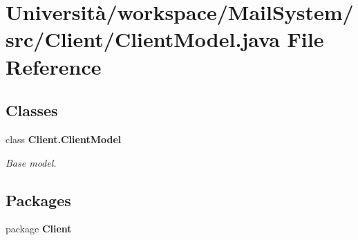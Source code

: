 \section{Università/workspace/\+Mail\+System/src/\+Client/\+Client\+Model.java File Reference}
\label{_client_model_8java}
\subsection*{Classes}
\begin{DoxyCompactItemize}
\item 
class \textbf{ Client.\+Client\+Model}
\begin{DoxyCompactList}\small\item\em Base model. \end{DoxyCompactList}\end{DoxyCompactItemize}
\subsection*{Packages}
\begin{DoxyCompactItemize}
\item 
package \textbf{ Client}
\end{DoxyCompactItemize}
